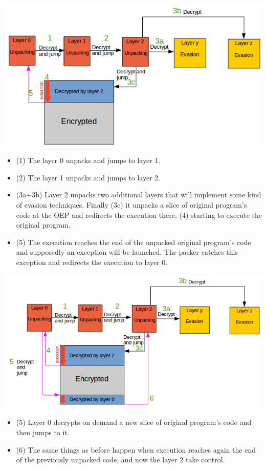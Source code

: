 \includegraphics[width=1\textwidth]{pictures/packer_type_5-1.png}

\begin{itemize}
\item (1) The layer 0 unpacks and jumps to layer 1.
\item (2) The layer 1 unpacks and jumps to layer 2.
\item (3a+3b) Layer 2 unpacks two additional layers that will implement some kind of evasion techniques. Finally (3c) it unpacks a slice of original program's code at the \ac{OEP} and redirects the execution there, (4) starting to execute the original program.
\item (5) The execution reaches the end of the unpacked original program's code and supposedly an exception will be launched. The packer catches this exception and redirects the execution to layer 0.
\end{itemize}

\includegraphics[width=1.1\textwidth]{pictures/packer_type_5-2.png}

\begin{itemize}
\item (5) Layer 0 decrypts on demand a new slice of original program's code and then jumps to it.
\item (6) The same things as before happen when execution reaches again the end of the previously unpacked code, and now the layer 2 take control.
\end{itemize}

